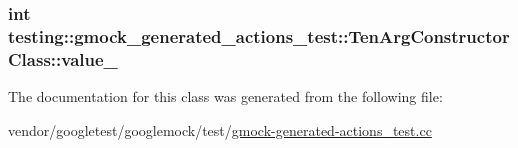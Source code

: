 \subsubsection[{\texorpdfstring{value\+\_\+}{value_}}]{\setlength{\rightskip}{0pt plus 5cm}int testing\+::gmock\+\_\+generated\+\_\+actions\+\_\+test\+::\+Ten\+Arg\+Constructor\+Class\+::value\+\_\+}\hypertarget{classtesting_1_1gmock__generated__actions__test_1_1TenArgConstructorClass_ae3c388fd7e3cfbb95196712076a368ad}{}\label{classtesting_1_1gmock__generated__actions__test_1_1TenArgConstructorClass_ae3c388fd7e3cfbb95196712076a368ad}


The documentation for this class was generated from the following file\+:\begin{DoxyCompactItemize}
\item 
vendor/googletest/googlemock/test/\hyperlink{gmock-generated-actions__test_8cc}{gmock-\/generated-\/actions\+\_\+test.\+cc}\end{DoxyCompactItemize}
